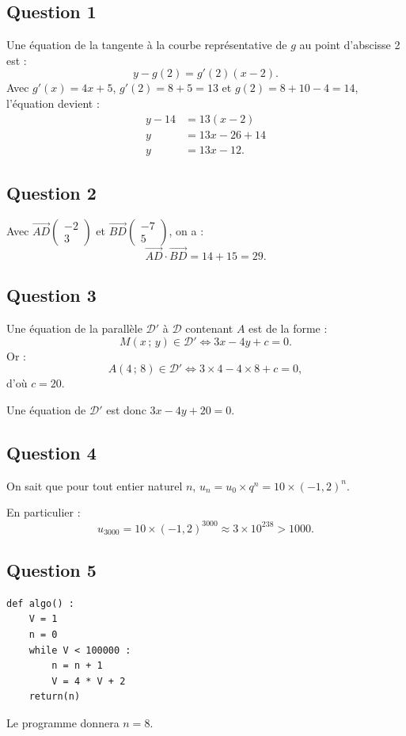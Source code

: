\subsection*{Question 1}

Une équation de la tangente à la courbe représentative de \(g\) au point d'abscisse 2 est :
\[
y - g(2) = g'(2)(x - 2).
\]
Avec \(g'(x) = 4x + 5\), \(g'(2) = 8 + 5 = 13\) et \(g(2) = 8 + 10 - 4 = 14\), l'équation devient :
\begin{align*}
y - 14 &= 13(x - 2) \\
y &= 13x - 26 + 14 \\
y &= 13x - 12.
\end{align*}

\subsection*{Question 2}

Avec \(\overrightarrow{AD} \begin{pmatrix} -2 \\ 3 \end{pmatrix}\) et \(\overrightarrow{BD} \begin{pmatrix} -7 \\ 5 \end{pmatrix}\), on a :
\[
\overrightarrow{AD} \cdot \overrightarrow{BD} = 14 + 15 = 29.
\]

\subsection*{Question 3}

Une équation de la parallèle \( \mathcal{D}' \) à \( \mathcal{D} \) contenant \( A \) est de la forme :
\[
M(x\,;\,y) \in \mathcal{D}' \iff 3x - 4y + c = 0.
\]
Or :
\[
A(4\,;\,8) \in \mathcal{D}' \iff 3 \times 4 - 4 \times 8 + c = 0,
\]
d'où  \(c = 20\).

Une équation de \( \mathcal{D}' \) est donc \( 3x - 4y + 20 = 0 \).

\subsection*{Question 4}

On sait que pour tout entier naturel \( n \), \( u_n = u_0 \times q^n = 10 \times (-1{,}2)^n \).

En particulier :
\[
u_{3000} = 10 \times (-1{,}2)^{3000} \approx 3 \times 10^{238} > 1000.
\]

\subsection*{Question 5}

\begin{center}
\begin{lstlisting}[style=python]
def algo() :
    V = 1
    n = 0
    while V < 100000 :
        n = n + 1
        V = 4 * V + 2
    return(n)
\end{lstlisting}
\end{center}
Le programme donnera \( n = 8 \).
